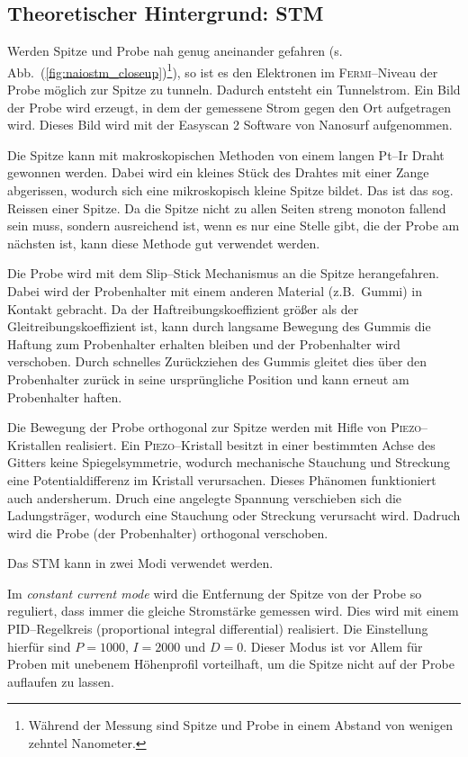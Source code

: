 \documentclass[sn-mathphys-num,iicol]{sn-jnl}
\theoremstyle{thmstyleone}
\theoremstyle{thmstyletwo}
\theoremstyle{thmstylethree}
\begin{document}
\subsection{Theoretischer Hintergrund: STM}
Werden Spitze und Probe nah genug aneinander gefahren (s. Abb.\ (\ref{fig:naiostm_closeup})\footnote{Während der Messung sind Spitze und Probe in einem Abstand von wenigen zehntel Nanometer.}), so ist es den Elektronen im \textsc{Fermi}--Niveau der Probe möglich zur Spitze zu tunneln.
Dadurch entsteht ein Tunnelstrom.
Ein Bild der Probe wird erzeugt, in dem der gemessene Strom gegen den Ort aufgetragen wird.
Dieses Bild wird mit der \glqq Easyscan 2\grqq{} Software von Nanosurf aufgenommen.

Die Spitze kann mit makroskopischen Methoden von einem langen Pt--Ir Draht gewonnen werden.
Dabei wird ein kleines Stück des Drahtes mit einer Zange abgerissen, wodurch sich eine mikroskopisch kleine Spitze bildet. Das ist das sog. Reissen einer Spitze.
Da die Spitze nicht zu allen Seiten streng monoton fallend sein muss, sondern ausreichend ist, wenn es nur eine Stelle gibt, die der Probe am nächsten ist, kann diese Methode gut verwendet werden. %

Die Probe wird mit dem Slip--Stick Mechanismus an die Spitze herangefahren.
Dabei wird der Probenhalter mit einem anderen Material (z.B.\ Gummi) in Kontakt gebracht.
Da der Haftreibungskoeffizient größer als der Gleitreibungskoeffizient ist, kann durch langsame Bewegung des Gummis die Haftung zum Probenhalter erhalten bleiben und der Probenhalter wird verschoben.
Durch schnelles Zurückziehen des Gummis gleitet dies über den Probenhalter zurück in seine ursprüngliche Position und kann erneut am Probenhalter haften.

Die Bewegung der Probe orthogonal zur Spitze werden mit Hifle von \textsc{Piezo}--Kristallen realisiert.
Ein \textsc{Piezo}--Kristall besitzt in einer bestimmten Achse des Gitters keine Spiegelsymmetrie, wodurch mechanische Stauchung und Streckung eine Potentialdifferenz im Kristall verursachen.
Dieses Phänomen funktioniert auch andersherum. %
Druch eine angelegte Spannung verschieben sich die Ladungsträger, wodurch eine Stauchung oder Streckung verursacht wird.
Dadruch wird die Probe (der Probenhalter) orthogonal verschoben. %

Das STM kann in zwei Modi verwendet werden.

Im \textit{constant current mode} wird die Entfernung der Spitze von der Probe so reguliert, dass immer die gleiche Stromstärke gemessen wird.
Dies wird mit einem PID--Regelkreis (proportional integral differential) realisiert.
Die Einstellung hierfür sind $P=1000$, $I=2000$ und $D=0$.
Dieser Modus ist vor Allem für Proben mit unebenem Höhenprofil vorteilhaft, um die Spitze nicht auf der Probe auflaufen zu lassen. %
\end{document}
